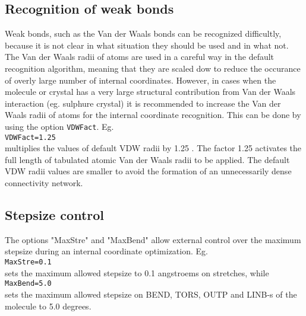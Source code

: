 \documentclass[prl,aps,preprint,superbib,12pt]{revtex4}
\begin{document}
\subsection{Recognition of weak bonds}
Weak bonds, such as the Van der Waals bonds can be recognized difficultly,
because it is not clear in what situation they should be used and in what 
not.
The Van der Waals radii of atoms are used in a careful way in the default 
recognition algorithm, meaning that they are scaled dow to reduce the occurance
of overly large number of internal coordinates.
However, in cases when the molecule or crystal has a very large structural
contribution from Van der Waals interaction (eg. sulphure crystal) it is recommended to increase the Van der Waals radii of atoms for the internal coordinate 
recognition. This can be done by using the option {\tt VDWFact}.
Eg. 
\\
{\tt VDWFact=1.25}
\\ 
multiplies the values of default VDW radii by 1.25 . The factor 1.25 activates 
the full length of tabulated atomic Van der Waals radii to be applied.
The default VDW radii values are smaller to avoid the formation of an unnecessarily dense connectivity network.

\subsection{Stepsize control}
The options "MaxStre" and "MaxBend" allow external control over the maximum
stepsize during an internal coordinate optimization.
Eg.
\\
{\tt MaxStre=0.1} 
\\
sets the maximum allowed stepsize to 0.1 angstroems on stretches,
while
\\
{\tt MaxBend=5.0}
\\
sets the maximum allowed stepsize on BEND, TORS, OUTP and LINB-s of the 
molecule to 5.0 degrees.
\end{document}
